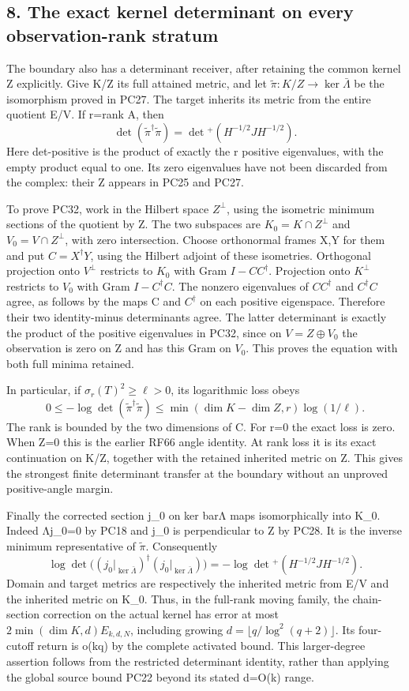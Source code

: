 \documentclass[11pt]{article}
\begin{document}
\subsection{8. The exact kernel determinant on every observation-rank stratum}\label{the-exact-kernel-determinant-on-every-observation-rank-stratum}

The boundary also has a determinant receiver, after retaining the common kernel Z explicitly. Give K/Z its full attained metric, and let \(\widetilde\pi:K/Z\to\ker\bar\Lambda\) be the isomorphism proved in PC27. The target inherits its metric from the entire quotient E/V. If r=rank A, then \[
\det(\widetilde\pi^\dagger\widetilde\pi)
=\det{}^+(H^{-1/2}JH^{-1/2}).
\tag{PC32}
\] Here det-positive is the product of exactly the r positive eigenvalues, with the empty product equal to one. Its zero eigenvalues have not been discarded from the complex: their Z appears in PC25 and PC27.

To prove PC32, work in the Hilbert space \(Z^\perp\), using the isometric minimum sections of the quotient by Z. The two subspaces are \(K_0=K\cap Z^\perp\) and \(V_0=V\cap Z^\perp\), with zero intersection. Choose orthonormal frames X,Y for them and put \(C=X^\dagger Y\), using the Hilbert adjoint of these isometries. Orthogonal projection onto \(V^\perp\) restricts to \(K_0\) with Gram \(I-CC^\dagger\). Projection onto \(K^\perp\) restricts to \(V_0\) with Gram \(I-C^\dagger C\). The nonzero eigenvalues of \(CC^\dagger\) and \(C^\dagger C\) agree, as follows by the maps C and \(C^\dagger\) on each positive eigenspace. Therefore their two identity-minus determinants agree. The latter determinant is exactly the product of the positive eigenvalues in PC32, since on \(V=Z\oplus V_0\) the observation is zero on Z and has this Gram on \(V_0\). This proves the equation with both full minima retained.

In particular, if \(\sigma_r(T)^2\ge\ell>0\), its logarithmic loss obeys \[
0\le-\log\det(\widetilde\pi^\dagger\widetilde\pi)
\le\min(\dim K-\dim Z,r)\log(1/\ell).
\tag{PC33}
\] The rank is bounded by the two dimensions of C. For r=0 the exact loss is zero. When Z=0 this is the earlier RF66 angle identity. At rank loss it is its exact continuation on K/Z, together with the retained inherited metric on Z. This gives the strongest finite determinant transfer at the boundary without an unproved positive-angle margin.

Finally the corrected section j\_0 on ker barΛ maps isomorphically into K\_0. Indeed Λj\_0=0 by PC18 and j\_0 is perpendicular to Z by PC28. It is the inverse minimum representative of \(\widetilde\pi\). Consequently \[
\log\det\bigl((j_0|_{\ker\bar\Lambda})^\dagger
(j_0|_{\ker\bar\Lambda})\bigr)
=-\log\det{}^+(H^{-1/2}JH^{-1/2}).
\tag{PC34}
\] Domain and target metrics are respectively the inherited metric from E/V and the inherited metric on K\_0. Thus, in the full-rank moving family, the chain-section correction on the actual kernel has error at most \(2\min(\dim K,d)E_{k,d,N}\), including growing \(d=\lfloor q/\log^2(q+2)\rfloor\). Its four-cutoff return is o(kq) by the complete activated bound. This larger-degree assertion follows from the restricted determinant identity, rather than applying the global source bound PC22 beyond its stated d=O(k) range.
\end{document}
